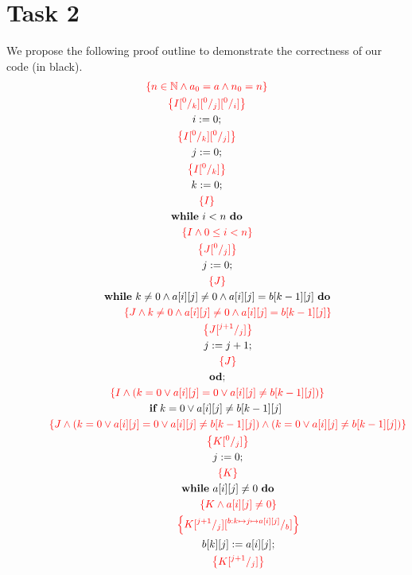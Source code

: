 \documentclass[a4paper,12pt,fleqn]{scrartcl}
\newcommand{\assn}[1]{{\color{red}\left\{#1\right\}}}
\begin{document}
\section{Task 2}
\label{sec:task-2}
We propose the following proof outline to demonstrate the correctness
of our code (in black).
\begin{gather*}
   \assn{n \in \nat \And a_0=a \And n_0=n}\\
   \assn{I\subst 0k \subst 0j \subst 0i}\\
   i\Ass 0;\\
   \assn{I\subst 0k \subst 0j}\\
   j\Ass 0;\\
   \assn{I\subst 0k}\\
   k\Ass 0;\\
   \assn{I}\\
   \WHILE~i<n~\DO\\
   \qquad \assn{I\And 0\leq i<n}\\
   \qquad \assn{J\subst0j}\\
   \qquad j\Ass0;\\
   \qquad \assn{J}\\
   \qquad \WHILE~k\neq0\And a[i][j]\neq0\And a[i][j]=b[k-1][j]~\DO\\
   \qquad \qquad \assn{J\And k\neq0\And a[i][j]\neq0\And a[i][j]=b[k-1][j]}\\
   \qquad \qquad \assn{J\subst{j+1}j}\\
   \qquad \qquad j\Ass j+1;\\
   \qquad \qquad \assn{J}\\
   \qquad \OD;\\
   \qquad \assn{I\And (k=0\Or a[i][j]=0\Or a[i][j]\neq b[k-1][j])}\\
   \qquad \IF~k=0\Or a[i][j]\neq b[k-1][j]~\\
   \qquad \qquad \assn{J\And (k=0\Or a[i][j]=0\Or a[i][j]\neq b[k-1][j])\And (k=0\Or a[i][j]\neq b[k-1][j])}\\
   \qquad \qquad \assn{K\subst0j}\\
   \qquad \qquad j\Ass0;\\
   \qquad \qquad \assn{K}\\
   \qquad \qquad \WHILE~a[i][j]\neq0~\DO\\
   \qquad \qquad \qquad \assn{K\And a[i][j]\neq0}\\
   \qquad \qquad \qquad \assn{K\subst{j+1}j \subst{b:k\mapsto j\mapsto a[i][j]}b}\\
   \qquad \qquad \qquad b[k][j]\Ass a[i][j];\\
   \qquad \qquad \qquad \assn{K\subst{j+1}j}\\
\end{gather*}
\end{document}
